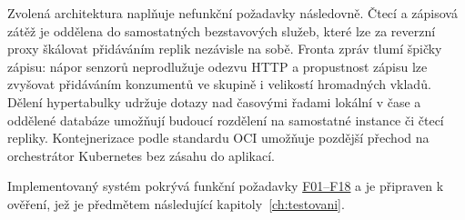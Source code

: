 Zvolená architektura naplňuje nefunkční požadavky následovně. Čtecí a zápisová zátěž je oddělena do samostatných bezstavových služeb, které lze za reverzní proxy škálovat přidáváním replik nezávisle na sobě. Fronta zpráv tlumí špičky zápisu: nápor senzorů neprodlužuje odezvu HTTP a propustnost zápisu lze zvyšovat přidáváním konzumentů ve skupině i velikostí hromadných vkladů. Dělení hypertabulky udržuje dotazy nad časovými řadami lokální v čase a oddělené databáze umožňují budoucí rozdělení na samostatné instance či čtecí repliky. Kontejnerizace podle standardu OCI umožňuje pozdější přechod na orchestrátor Kubernetes bez zásahu do aplikací.

Implementovaný systém pokrývá funkční požadavky \hyperref[tab:funkcni-pozadavky]{F01--F18} a je připraven k ověření, jež je předmětem následující kapitoly~\ref{ch:testovani}.
